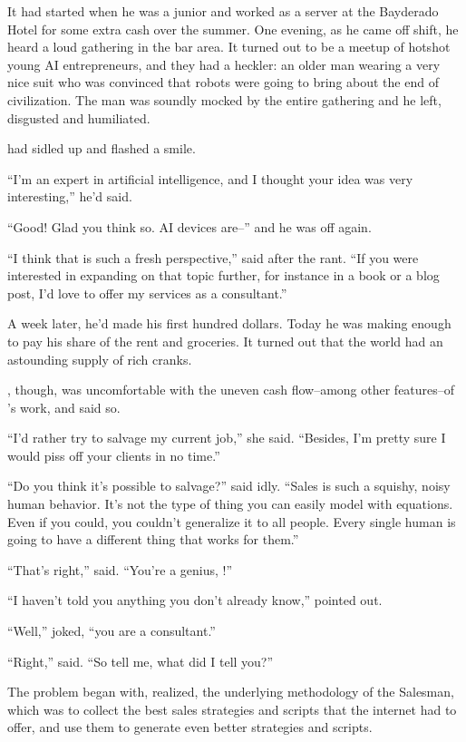 It had started when he was a junior and worked as a server at the Bayderado Hotel for some extra cash over the summer. One evening, as he came off shift, he heard a loud gathering in the bar area. It turned out to be a meetup of hotshot young AI entrepreneurs, and they had a heckler: an older man wearing a very nice suit who was convinced that robots were going to bring about the end of civilization. The man was soundly mocked by the entire gathering and he left, disgusted and humiliated.

{\sidetag} had sidled up and flashed a smile.

``I'm an expert in artificial intelligence, and I thought your idea was very interesting,'' he'd said.

``Good! Glad you think so. AI devices are--'' and he was off again.

``I think that is such a fresh perspective,'' {\sidetag} said after the rant. ``If you were interested in expanding on that topic further, for instance in a book or a blog post, I'd love to offer my services as a consultant.''

A week later, he'd made his first hundred dollars. Today he was making enough to pay his share of the rent and groceries. It turned out that the world had an astounding supply of rich cranks.

{\protag}, though, was uncomfortable with the uneven cash flow--among other features--of {\sidetag}'s work, and said so.

``I'd rather try to salvage my current job,'' she said. ``Besides, I'm pretty sure I would piss off your clients in no time.''

``Do you think it's possible to salvage?'' {\sidetag} said idly. ``Sales is such a squishy, noisy human behavior. It's not the type of thing you can easily model with equations. Even if you could, you couldn't generalize it to all people. Every single human is going to have a different thing that works for them.''

``That's right,'' {\protag} said. ``You're a genius, {\sidetag}!''

``I haven't told you anything you don't already know,'' {\sidetag} pointed out.

``Well,'' {\protag} joked, ``you are a consultant.''

``Right,'' {\sidetag} said. ``So tell me, what did I tell you?''

\bigbreak

The problem began with, {\protag} realized, the underlying methodology of the Salesman, which was to collect the best sales strategies and scripts that the internet had to offer, and use them to generate even better strategies and scripts.

